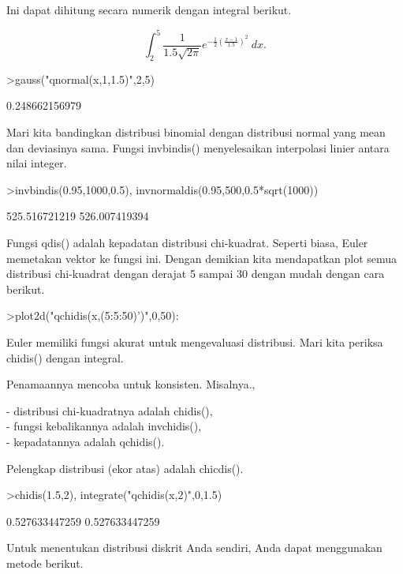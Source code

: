 \documentclass[a4paper,10pt]{article}
\begin{document}
\begin{eulernotebook}
\begin{eulercomment}
\begin{eulercomment}
\begin{euleroutput}
\end{euleroutput}
\begin{eulercomment}
Ini dapat dihitung secara numerik dengan integral berikut.\\
\end{eulercomment}
\begin{eulerformula}
\[
\int_2^5 \frac{1}{1.5\sqrt{2\pi}}e^{-\frac{1}{2}(\frac{x-1}{1.5})^2}\ dx.
\]
\end{eulerformula}
\begin{eulerprompt}
>gauss("qnormal(x,1,1.5)",2,5)
\end{eulerprompt}
\begin{euleroutput}
  0.248662156979
\end{euleroutput}
\begin{eulercomment}
Mari kita bandingkan distribusi binomial dengan distribusi normal yang
mean dan deviasinya sama. Fungsi invbindis() menyelesaikan interpolasi
linier antara nilai integer.
\end{eulercomment}
\begin{eulerprompt}
>invbindis(0.95,1000,0.5), invnormaldis(0.95,500,0.5*sqrt(1000))
\end{eulerprompt}
\begin{euleroutput}
  525.516721219
  526.007419394
\end{euleroutput}
\begin{eulercomment}
Fungsi qdis() adalah kepadatan distribusi chi-kuadrat. Seperti biasa,
Euler memetakan vektor ke fungsi ini. Dengan demikian kita mendapatkan
plot semua distribusi chi-kuadrat dengan derajat 5 sampai 30 dengan
mudah dengan cara berikut.
\end{eulercomment}
\begin{eulerprompt}
>plot2d("qchidis(x,(5:5:50)')",0,50):
\end{eulerprompt}
\begin{eulercomment}
Euler memiliki fungsi akurat untuk mengevaluasi distribusi. Mari kita
periksa chidis() dengan integral.

Penamaannya mencoba untuk konsisten. Misalnya.,

- distribusi chi-kuadratnya adalah chidis(),\\
- fungsi kebalikannya adalah invchidis(),\\
- kepadatannya adalah qchidis().

Pelengkap distribusi (ekor atas) adalah chicdis().
\end{eulercomment}
\begin{eulerprompt}
>chidis(1.5,2), integrate("qchidis(x,2)",0,1.5)
\end{eulerprompt}
\begin{euleroutput}
  0.527633447259
  0.527633447259
\end{euleroutput}
\begin{eulercomment}
Untuk menentukan distribusi diskrit Anda sendiri, Anda dapat
menggunakan metode berikut.


\end{eulercomment}
\end{eulercomment}
\end{eulercomment}
\end{eulernotebook}
\end{document}
